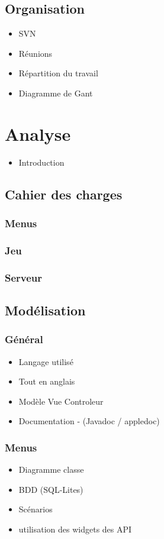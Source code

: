 \documentclass[]{report}
\begin{document}
	\section{Organisation}
		\begin{itemize}
			\item{SVN}
			\item{Réunions}
			\item{Répartition du travail}
			\item{Diagramme de Gant}
		\end{itemize}
	
	
\chapter{Analyse}
	\begin{itemize}
		\item{Introduction}
	\end{itemize}
	
	\section{Cahier des charges}
		\subsection{Menus}
		\subsection{Jeu}
		\subsection{Serveur}
	
	\section{Modélisation}
		\subsection{Général}
			\begin{itemize}
				\item{Langage utilisé}
				\item{Tout en anglais}
				\item{Modèle Vue Controleur}
				\item{Documentation - (Javadoc / appledoc)}
			\end{itemize}
			
		\subsection{Menus}
			\begin{itemize}
				\item{Diagramme classe}
				\item{BDD (SQL-Lites)}
				\item{Scénarios}
				\item{utilisation des widgets des API}
			\end{itemize}
			
\end{document}
